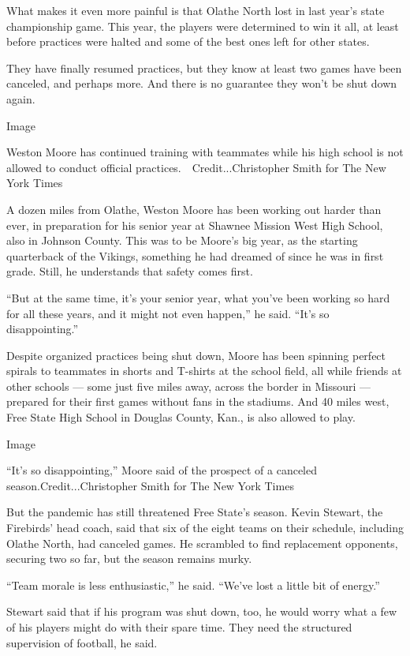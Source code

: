 What makes it even more painful is that Olathe North lost in last year's
state championship game. This year, the players were determined to win
it all, at least before practices were halted and some of the best ones
left for other states.

They have finally resumed practices, but they know at least two games
have been canceled, and perhaps more. And there is no guarantee they
won't be shut down again.

Image

Weston Moore has continued training with teammates while his high school
is not allowed to conduct official practices.~~Credit...Christopher
Smith for The New York Times

A dozen miles from Olathe, Weston Moore has been working out harder than
ever, in preparation for his senior year at Shawnee Mission West High
School, also in Johnson County. This was to be Moore's big year, as the
starting quarterback of the Vikings, something he had dreamed of since
he was in first grade. Still, he understands that safety comes first.

``But at the same time, it's your senior year, what you've been working
so hard for all these years, and it might not even happen,'' he said.
``It's so disappointing.''

Despite organized practices being shut down, Moore has been spinning
perfect spirals to teammates in shorts and T-shirts at the school field,
all while friends at other schools --- some just five miles away, across
the border in Missouri --- prepared for their first games without fans
in the stadiums. And 40 miles west, Free State High School in Douglas
County, Kan., is also allowed to play.

Image

``It's so disappointing,'' Moore said of the prospect of a canceled
season.Credit...Christopher Smith for The New York Times

But the pandemic has still threatened Free State's season. Kevin
Stewart, the Firebirds' head coach, said that six of the eight teams on
their schedule, including Olathe North, had canceled games. He scrambled
to find replacement opponents, securing two so far, but the season
remains murky.

``Team morale is less enthusiastic,'' he said. ``We've lost a little bit
of energy.''

Stewart said that if his program was shut down, too, he would worry what
a few of his players might do with their spare time. They need the
structured supervision of football, he said.

